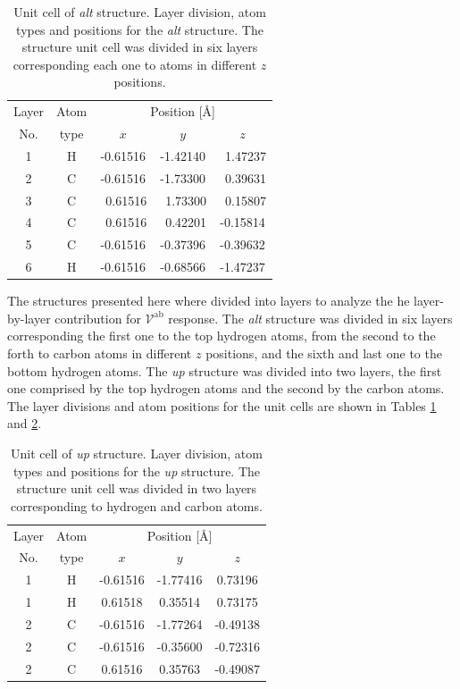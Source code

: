 \documentclass[twocolumn]{article}
\begin{document}
\begin{table}[tb]
\center
\begin{tabular}{ccccc}\\
\hline
Layer & Atom & \multicolumn{3}{c}{Position [\AA]} \\
\cline{3-5}
No. & type & $x$ & $y$ & $z$  \\
\hline
1 & H &  -0.61516 &  -1.42140 & \ 1.47237 \\
2 & C &  -0.61516 &  -1.73300 & \ 0.39631 \\
3 & C & \ 0.61516 & \ 1.73300 & \ 0.15807 \\
4 & C & \ 0.61516 & \ 0.42201 &  -0.15814 \\
5 & C &  -0.61516 &  -0.37396 &  -0.39632 \\
6 & H &  -0.61516 &  -0.68566 &  -1.47237 \\
\hline
\end{tabular}
\caption{Unit cell of \emph{alt} structure. Layer division, atom types and
positions for the \emph{alt} structure. The structure unit cell was divided in
six layers corresponding each one to atoms in different $z$ positions.}
\label{tab:altunitcell}
\end{table}

The structures presented here where divided into layers to analyze the he layer-
by-layer contribution for $\mathcal{V}^{\mathrm{ab}}$ response. The \emph{alt}
structure was divided in six layers corresponding the first one to the top
hydrogen atoms, from the second to the forth to carbon atoms in different $z$
positions, and the sixth and last one to the bottom hydrogen atoms. The
\emph{up} structure was divided into two layers, the first one comprised by the
top hydrogen atoms and the second by the carbon atoms. The layer divisions and
atom positions for the unit cells are shown in Tables \ref{tab:altunitcell} and
\ref{tab:upunitcell}.

\begin{table}[tb]
\center
\begin{tabular}{ccccc}\\
\hline
Layer & Atom & \multicolumn{3}{c}{Position [\AA]} \\
\cline{3-5}
No. & type & $x$ & $y$ & $z$  \\
\hline
1 & H & -0.61516 & -1.77416 &  0.73196 \\
1 & H &  0.61518 &  0.35514 &  0.73175 \\
2 & C & -0.61516 & -1.77264 & -0.49138 \\
2 & C & -0.61516 & -0.35600 & -0.72316 \\
2 & C &  0.61516 &  0.35763 & -0.49087 \\
\hline
\end{tabular}
\caption{Unit cell of \emph{up} structure. Layer division, atom types and
positions for the \emph{up} structure. The structure unit cell was divided in
two layers corresponding to hydrogen and carbon atoms.}
\label{tab:upunitcell}
\end{table}
\end{document}
